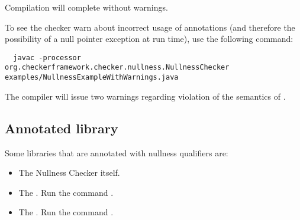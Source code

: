 \noindent
Compilation will complete without warnings.

To see the checker warn about incorrect usage of annotations (and therefore the
possibility of a null pointer exception at run time), use the following command:

\begin{Verbatim}
  javac -processor org.checkerframework.checker.nullness.NullnessChecker examples/NullnessExampleWithWarnings.java
\end{Verbatim}

\noindent
The compiler will issue two warnings regarding violation of the semantics of
.


\subsection{Annotated library\label{nullness-annotated-library}}

Some libraries that are annotated with nullness qualifiers are:

\begin{itemize}
\item
The Nullness Checker itself.

\item
The
.
Run the command .


\item
The
.
Run the command .

%
%
%

\end{itemize}


